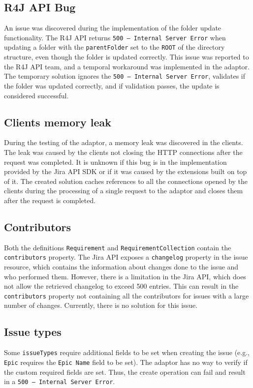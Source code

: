 \subsection*{R4J API Bug}
An issue was discovered during the implementation of the folder update functionality. The R4J API returns \texttt{500 -- Internal Server Error} when updating a folder with the \texttt{parentFolder} set to the \texttt{ROOT} of the directory structure, even though the folder is updated correctly. This issue was reported to the R4J API team, and a temporal workaround was implemented in the adaptor. The temporary solution ignores the \texttt{500 -- Internal Server Error}, validates if the folder was updated correctly, and if validation passes, the update is considered successful.

\subsection*{Clients memory leak}
During the testing of the adaptor, a memory leak was discovered in the clients. The leak was caused by the clients not closing the HTTP connections after the request was completed. It is unknown if this bug is in the implementation provided by the Jira API SDK or if it was caused by the extensions built on top of it. The created solution caches references to all the connections opened by the clients during the processing of a single request to the adaptor and closes them after the request is completed.

\subsection*{Contributors}
Both the definitions \texttt{Requirement} and \texttt{RequirementCollection} contain the \texttt{contributors} property. The Jira API exposes a \texttt{changelog} property in the issue resource, which contains the information about changes done to the issue and who performed them. However, there is a limitation in the Jira API, which does not allow the retrieved changelog to exceed 500 entries. This can result in the \texttt{contributors} property not containing all the contributors for issues with a large number of changes. Currently, there is no solution for this issue.

\subsection*{Issue types}
Some \texttt{issueTypes} require additional fields to be set when creating the issue (e.g., \texttt{Epic} requires the \texttt{Epic Name} field to be set). The adaptor has no way to verify if the custom required fields are set. Thus, the create operation can fail and result in a \texttt{500 -- Internal Server Error}.

